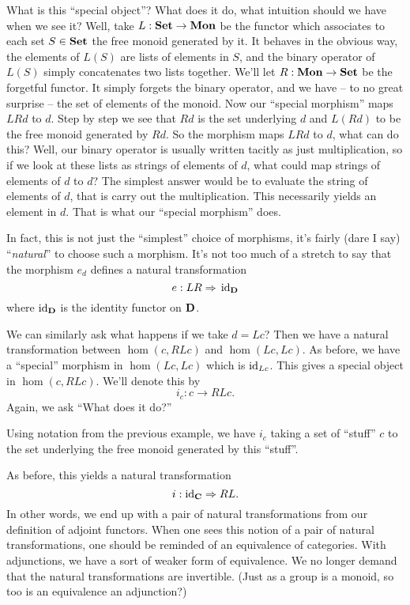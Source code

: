 What is this ``special object''? What does it do, what intuition
should we have when we see it? Well, take $L:\mathbf{Set}\to\mathbf{Mon}$
be the functor which associates to each set $S\in\mathbf{Set}$ the
free monoid generated by it. It behaves in the obvious way, the
elements of $L(S)$ are lists of elements in $S$, and the binary
operator of $L(S)$ simply concatenates two lists together. We'll
let $R:\mathbf{Mon}\to\mathbf{Set}$ be the forgetful functor.  It simply
forgets the binary operator, and we have -- to no great surprise
-- the set of elements of the monoid. Now our ``special
morphism'' maps $LRd$ to $d$. Step by step we see that $Rd$ is
the set underlying $d$ and $L(Rd)$ to be the free monoid
generated by $Rd$. So the morphism maps $LRd$ to $d$, what can do
this? Well, our binary operator is usually written tacitly as
just multiplication, so if we look at these lists as strings of
elements of $d$, what could map strings of elements of $d$ to
$d$? The simplest answer would be to evaluate the string of
elements of $d$, that is carry out the multiplication. This
necessarily yields an element in $d$. That is what our ``special
morphism'' does.

In fact, this is not just the ``simplest'' choice of morphisms,
it's fairly (dare I say) ``\emph{natural}'' to choose such a
morphism. It's not too much of a stretch to say that the morphism
$e_{d}$ defines a natural transformation
\begin{equation}
e:LR\Rightarrow{}\operatorname{id}_{\mathbf{D}}
\end{equation}
where $\operatorname{id}_{\mathbf{D}}$ is the identity functor on $\mathbf{D}$.

We can similarly ask what happens if we take $d=Lc$? Then we have
a natural transformation between $\hom(c,RLc)$ and
$\hom(Lc,Lc)$. As before, we have a ``special'' morphism in
$\hom(Lc,Lc)$ which is $\operatorname{id}_{Lc}$. This gives a special object in
$\hom(c,RLc)$. We'll denote this by
\begin{equation}
i_{c}:c\to{}RLc.
\end{equation}
Again, we ask ``What does it do?''

Using notation from the previous example, we have $i_{c}$ taking
a set of ``stuff'' $c$ to the set underlying the free monoid
generated by this ``stuff''.

As before, this yields a natural transformation
\begin{equation}
i:\operatorname{id}_{\mathbf{C}}\Rightarrow{}RL.
\end{equation}
In other words, we end up with a pair of natural transformations
from our definition of adjoint functors. When one sees this
notion of a pair of natural transformations, one should be
reminded of an equivalence of categories. With adjunctions, we
have a sort of weaker form of equivalence. We no longer demand
that the natural transformations are invertible. (Just as a group
is a monoid, so too is an equivalence an adjunction?)

